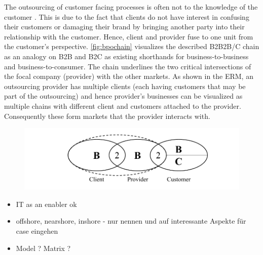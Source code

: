 	The outsourcing of customer facing processes is often not to the knowledge of the customer . This is due to the fact that clients do not have interest in confusing their customers or damaging their brand by bringing another party into their relationship with the customer. Hence, client and provider fuse to one unit from the customer's perspective. \ref{fig:bpochain} visualizes the described B2B2B/C chain as an analogy on B2B and B2C as existing shorthands for business-to-business and business-to-consumer. The chain underlines the two critical intersections of the focal company (provider) with the other markets. As shown in the ERM, an outsourcing provider has multiple clients (each having customers that may be part of the outsourcing) and hence provider's businesses can be visualized as multiple chains with different client and customers attached to the provider. Consequently these form markets that the provider interacts with.
	
		\begin{figure}[caption={BPO B2B2B/C Chain}, label={fig:bpochain}]
	{	\includegraphics[width=.8\textwidth]{figures/bpochain.pdf}}
	\end{figure}

			
		\begin{itemize}
			\item IT as an enabler ok 
			\item offshore, nearshore, inshore - nur nennen und auf interessante Aspekte für case eingehen
			\item Model ? Matrix ? 
		\end{itemize}
	
